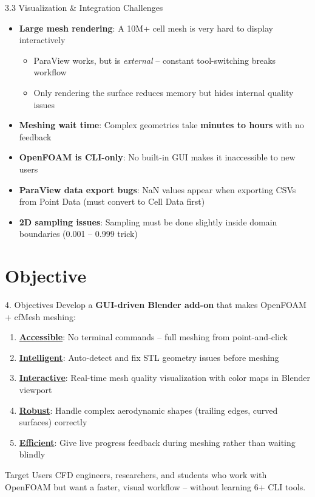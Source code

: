 \documentclass[dvipsnames,mathserif]{beamer}
\begin{document}
\begin{frame}{3.3 Visualization \& Integration Challenges}
    \begin{itemize}
        \item \textbf{Large mesh rendering}: A 10M+ cell mesh is very hard to display interactively
        \begin{itemize}
            \item ParaView works, but is \textit{external} -- constant tool-switching breaks workflow
            \item Only rendering the surface reduces memory but hides internal quality issues
        \end{itemize}
        \item \textbf{Meshing wait time}: Complex geometries take \textbf{minutes to hours} with no feedback
        \item \textbf{OpenFOAM is CLI-only}: No built-in GUI makes it inaccessible to new users
        \item \textbf{ParaView data export bugs}: NaN values appear when exporting CSVs from Point Data (must convert to Cell Data first)
        \item \textbf{2D sampling issues}: Sampling must be done slightly inside domain boundaries (0.001 -- 0.999 trick)
    \end{itemize}
\end{frame}


\section{Objective}
\begin{frame}{4. Objectives}
    Develop a \textbf{GUI-driven Blender add-on} that makes OpenFOAM + cfMesh meshing:
    \vspace{0.2cm}
    \begin{enumerate}
        \item \textbf{\underline{Accessible}}: No terminal commands -- full meshing from point-and-click
        \item \textbf{\underline{Intelligent}}: Auto-detect and fix STL geometry issues before meshing
        \item \textbf{\underline{Interactive}}: Real-time mesh quality visualization with color maps in Blender viewport
        \item \textbf{\underline{Robust}}: Handle complex aerodynamic shapes (trailing edges, curved surfaces) correctly
        \item \textbf{\underline{Efficient}}: Give live progress feedback during meshing rather than waiting blindly
    \end{enumerate}
    \vspace{0.2cm}
    \begin{block}{Target Users}
        CFD engineers, researchers, and students who work with OpenFOAM but want a faster, visual workflow -- without learning 6+ CLI tools.
    \end{block}
\end{frame}
\end{document}
